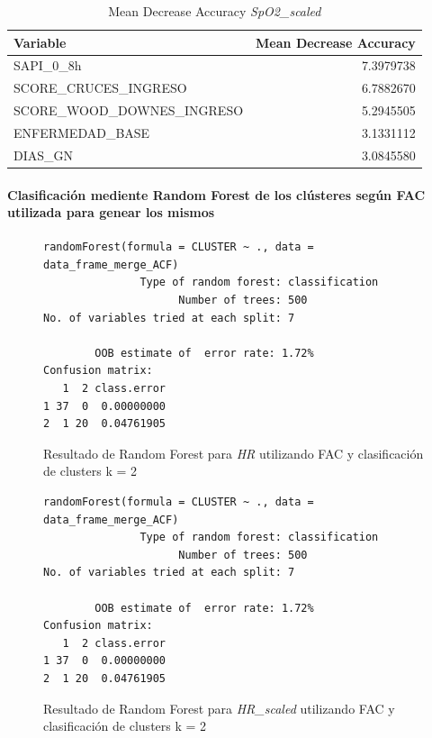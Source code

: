 \begin{table}[H]
    \centering
    \begin{tabular}{lr}
        \toprule
        \textbf{Variable} & \textbf{Mean Decrease Accuracy} \\
        \midrule
        SAPI\_0\_8h & 7.3979738 \\
        SCORE\_CRUCES\_INGRESO & 6.7882670 \\
        SCORE\_WOOD\_DOWNES\_INGRESO & 5.2945505 \\
        ENFERMEDAD\_BASE & 3.1331112 \\
        DIAS\_GN & 3.0845580 \\
        \bottomrule
    \end{tabular}
    \caption{Mean Decrease Accuracy \textit{SpO2\_scaled}}
\end{table}


\paragraph{Clasificación mediente Random Forest de los clústeres según FAC utilizada para genear los mismos} 

\begin{figure}[H]
    \centering
    \begin{lstlisting}[frame=single, basicstyle=\small\ttfamily]
        randomForest(formula = CLUSTER ~ ., data = data_frame_merge_ACF) 
               Type of random forest: classification
                     Number of trees: 500
No. of variables tried at each split: 7

        OOB estimate of  error rate: 1.72%
Confusion matrix:
   1  2 class.error
1 37  0  0.00000000
2  1 20  0.04761905
    \end{lstlisting}
    \caption{Resultado de Random Forest para \textit{HR} utilizando FAC y clasificación de clusters k = 2}\label{fig:random_forest_acf_result_RF_1}
\end{figure}
\begin{figure}[H]
    \centering
    \begin{lstlisting}[frame=single, basicstyle=\small\ttfamily]
        randomForest(formula = CLUSTER ~ ., data = data_frame_merge_ACF) 
               Type of random forest: classification
                     Number of trees: 500
No. of variables tried at each split: 7

        OOB estimate of  error rate: 1.72%
Confusion matrix:
   1  2 class.error
1 37  0  0.00000000
2  1 20  0.04761905
    \end{lstlisting}
    \caption{Resultado de Random Forest para \textit{HR\_scaled} utilizando FAC y clasificación de clusters k = 2}
    \label{fig:random_forest_acf_result_RF_2}
\end{figure}

